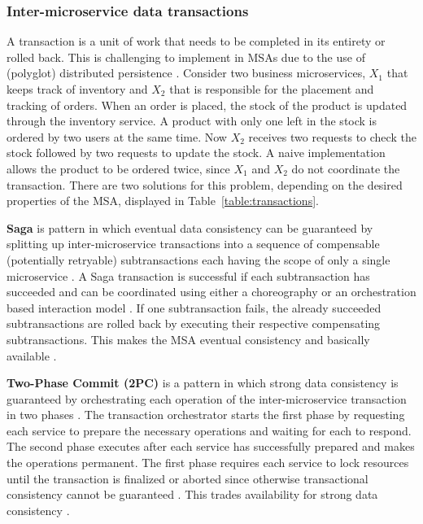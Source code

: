 \subsubsection{Inter-microservice data transactions}
A transaction is a unit of work that needs to be completed in its entirety or rolled back. This is challenging to implement in MSAs due to the use of (polyglot) distributed persistence \cite{richardson2018microservices,IBMBook,Laigner20213348}. Consider two business microservices, $X_1$ that keeps track of inventory and $X_2$ that is responsible for the placement and tracking of orders. When an order is placed, the stock of the product is updated through the inventory service. A product with only one left in the stock is ordered by two users at the same time. Now $X_2$ receives two requests to check the stock followed by two requests to update the stock. A naive implementation allows the product to be ordered twice, since $X_1$ and $X_2$ do not coordinate the transaction. There are two solutions for this problem, depending on the desired properties of the MSA, displayed in Table~\ref{table:transactions}.

\textbf{Saga} is pattern in which eventual data consistency can be guaranteed by splitting up inter-microservice transactions into a sequence of compensable (potentially retryable) subtransactions each having the scope of only a single microservice \cite{richardson2018microservices,Laigner20213348}. A Saga transaction is successful if each subtransaction has succeeded and can be coordinated using either a choreography or an orchestration based interaction model \cite{richardson2018microservices}. If one subtransaction fails, the already succeeded subtransactions are rolled back by executing their respective compensating subtransactions. This makes the MSA eventual consistency and basically available \cite{6133253}.

\textbf{Two-Phase Commit (2PC)} is a pattern in which strong data consistency is guaranteed by orchestrating each operation of the inter-microservice transaction in two phases \cite{Laigner20213348,richardson2018microservices}. The transaction orchestrator starts the first phase by requesting each service to prepare the necessary operations and waiting for each to respond. The second phase executes after each service has successfully prepared and makes the operations permanent. The first phase requires each service to lock resources until the transaction is finalized or aborted since otherwise transactional consistency cannot be guaranteed \cite{ports2010transactional,Laigner20213348}. This trades availability for strong data consistency \cite{richardson2018microservices}.

